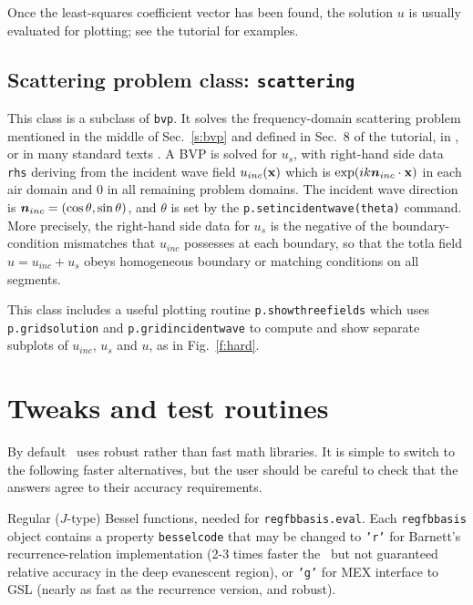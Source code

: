 \documentclass[12pt]{article}
\begin{document}
Once the least-squares coefficient vector has been found, the
solution $u$ is usually evaluated for plotting; see the tutorial for examples.



\subsection{Scattering problem class: {\tt scattering}}

This class is a subclass of {\tt bvp}.
It solves the frequency-domain
scattering problem mentioned in the middle of Sec.~\ref{s:bvp}
and defined in Sec.~8 of the tutorial, in \cite{polygonscatt},
or in many standard texts \cite{coltonkress}.
A BVP is solved for $u_s$, with right-hand side data {\tt rhs} deriving
from the incident wave field $u_{inc}(\textbf{x})$
which is $\exp(ik {\bm n}_{inc} \cdot \textbf{x})$ in each air domain
and 0 in all remaining problem domains.
The incident wave direction is ${\bm n}_{inc} = (\cos \theta,\sin \theta)$,
and $\theta$ is set by the {\tt p.setincidentwave(theta)} command.
More precisely, the right-hand side data for $u_s$ is
the negative of the boundary-condition mismatches that $u_{inc}$
possesses at each boundary, so that the totla field $u=u_{inc}+u_s$ obeys
homogeneous boundary or matching conditions on all segments.

This class includes a useful plotting routine
{\tt p.showthreefields} which uses {\tt p.gridsolution} and
{\tt p.gridincidentwave} to compute and show separate subplots of
$u_{inc}$, $u_s$ and $u$, as in Fig.~\ref{f:hard}.




\section{Tweaks and test routines}
\label{s:tweak}

By default \mpspack\ uses robust rather than fast math libraries.
It is simple to switch to the following
faster alternatives, but the user should be careful
to check that the answers agree to their accuracy requirements.
\ben
\item Regular ($J$-type) Bessel functions, needed for {\tt regfbbasis.eval}.
Each {\tt regfbbasis} object contains a property {\tt besselcode}
that may be changed to {\tt 'r'} for Barnett's recurrence-relation
implementation (2-3 times faster the \matlab\ but
not guaranteed relative accuracy in
the deep evanescent region),
or {\tt 'g'} for MEX interface to GSL (nearly as fast as the recurrence
version, and robust).
\end{document}
